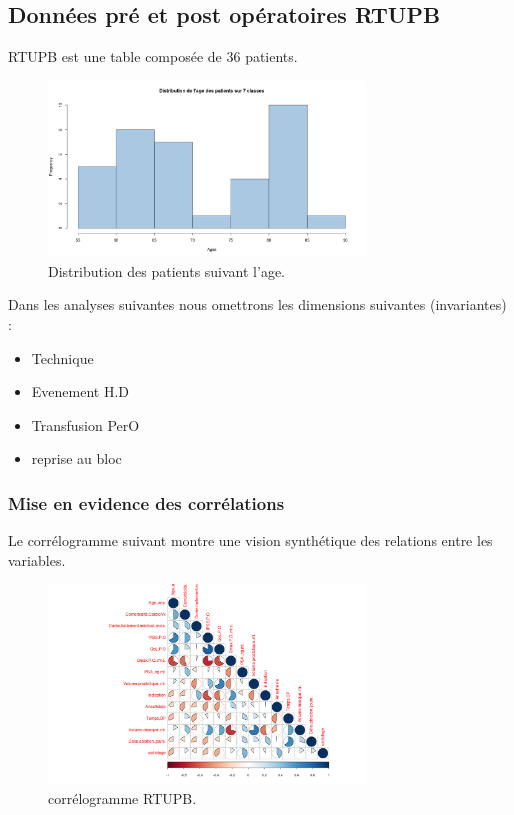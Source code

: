 \subsection{Données pré et post opératoires RTUPB}

RTUPB est une table composée de 36 patients. 
	
\begin{figure}[!h]
\centering
\includegraphics[width=0.75\textwidth]{../Fig/RTUPB/rtupb-age-frequency.png}
\caption{Distribution des patients suivant l'age.}
\end{figure}

Dans les analyses suivantes nous omettrons les dimensions suivantes  (invariantes)  :  
\begin{itemize}
\item Technique
\item Evenement H.D
\item Transfusion PerO
\item reprise au bloc 
\end{itemize}


\subsubsection{Mise en evidence des corrélations}

Le corrélogramme suivant montre une vision synthétique des relations  entre les variables.

\begin{figure}[!h]
\centering
\includegraphics[width=0.75\textwidth]{../Fig/RTUPB/rtupb-matrice-cor-graph.png}
\caption{corrélogramme RTUPB.}
\end{figure}

